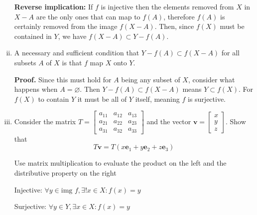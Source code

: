 \documentclass{article}
\begin{document}
\begin{enumerate}[(i)]
    \textbf{Reverse implication:} If $f$ is injective then the elements removed from $X$ in $X - A$ are the only ones that can map to $f(A)$, therefore $f(A)$ is certainly removed from the image $f(X - A)$. Then, since $f(X)$ must be contained in $Y$, we have $f(X - A) \subset Y - f(A)$.

    \item A necessary and sufficient condition that $Y - f(A) \subset f(X - A)$ for all subsets $A$ of $X$ is that $f$ map $X$ onto $Y$.
    
    \textbf{Proof.} Since this must hold for $A$ being any subset of $X$, consider what happens when $A = \varnothing$. Then $Y - f(A) \subset f(X - A)$ means $Y \subset f(X)$. For $f(X)$ to contain $Y$ it must be all of $Y$ itself, meaning $f$ is surjective.

    \item Consider the matrix $T =
    \begin{bmatrix}
        a_{11} & a_{12} & a_{13} \\
        a_{21} & a_{22} & a_{23} \\
        a_{31} & a_{32} & a_{33}
    \end{bmatrix}$ and the vector $\mathbf{v} = \begin{bmatrix}x \\ y \\ z\end{bmatrix}$. Show that
    $$T\mathbf{v} = T(x\mathbf{e}_1 + y\mathbf{e}_2 + z\mathbf{e}_3) $$

    Use matrix multiplication to evaluate the product on the left and the distributive property on the right
    
    Injective: $\forall y \in \text{img }f,  \exists! x \in X: f(x) = y$

    Surjective: $\forall y \in Y, \exists x \in X: f(x) = y $
\end{enumerate}
\end{document}
